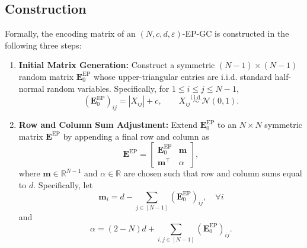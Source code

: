 \documentclass[lettersize,journal]{IEEEtran}
\newcommand{\GEP}{\boldsymbol{E}^{\mathrm{EP}}}
\begin{document}
\subsection{Construction}
\label{sec:sparse-graph-gradient-code-encoding-matrix-construction}
Formally, the encoding matrix of an $(N,c, d,\varepsilon)$-EP-GC is constructed in the following three steps:
\begin{enumerate}
    \item \textbf{Initial Matrix Generation:} 
    Construct a symmetric $(N-1)\times(N-1)$ random matrix $\GEP_0$ whose upper-triangular entries are i.i.d. standard half-normal random variables. Specifically, for $1\le i\le j\le N-1$,
\[
(\GEP_0)_{ij} = |X_{ij}|+c,\qquad X_{ij}\overset{\mathrm{i.i.d.}}{\sim}\mathcal{N}(0,1).
\]
    \item \textbf{Row and Column Sum Adjustment:}
Extend $\GEP_0$ to an $N\times N$ symmetric matrix $\GEP$ by appending a final row and column as
\begin{equation}
\label{eq:extended-sparse-graph-scheduling-matrix}
\GEP =
\begin{bmatrix}
\GEP_0 & \boldsymbol{m} \\
\boldsymbol{m}^\top & \alpha
\end{bmatrix},
\end{equation}
where $\boldsymbol{m}\in\mathbb{R}^{N-1}$ and $\alpha\in\mathbb{R}$ are chosen such that row and column sums equal to $d$.
Specifically, let
\begin{equation}
\label{eq:append-col}
    \textstyle
\boldsymbol{m}_i = d - \sum_{j\in[N-1]} (\GEP_0)_{i j},
\quad \forall i
\end{equation}
and
\begin{equation}
\label{eq:alpha}
    \textstyle
\alpha = (2-N)d + \sum_{i, j\in[N-1]} (\GEP_0)_{ij}.
\end{equation}

\end{enumerate}
\end{document}
